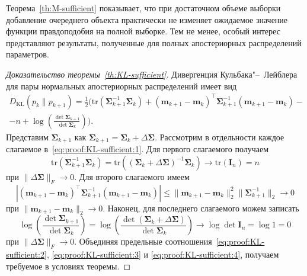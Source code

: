 Теорема~\ref{th:M-sufficient} показывает, что при достаточном объеме выборки добавление очереднего объекта практически не изменяет ожидаемое значение функции правдоподобия на полной выборке. Тем не менее, особый интерес представляют результаты, полученные для полных апостериорных распределений параметров.

\begin{proof}[Доказательство теоремы~\ref{th:KL-sufficient}]
    Дивергенция Кульбака"--~Лейблера для пары нормальных апостериорных распределений имеет вид
    \begin{multline}
        D_{\text{KL}}\left( p_k \| p_{k+1} \right) = \frac{1}{2} \Bigg( \mathrm{tr}\left( \mathbf{\Sigma}_{k+1}^{-1} \mathbf{\Sigma}_k \right) + (\mathbf{m}_{k+1} - \mathbf{m}_k)^\top \mathbf{\Sigma}_{k+1}^{-1} (\mathbf{m}_{k+1} - \mathbf{m}_k) - \\
        - n + \log{\left( \frac{\det \mathbf{\Sigma}_{k+1}}{\det \mathbf{\Sigma}_{k}} \right)} \Bigg). \label{eq:proof:KL-sufficient:1}
    \end{multline}
    Представим $\boldsymbol{\Sigma}_{k+1}$ как $\boldsymbol{\Sigma}_{k+1} = \boldsymbol{\Sigma}_k + \Delta \boldsymbol{\Sigma}$. Рассмотрим в отдельности каждое слагаемое в~\eqref{eq:proof:KL-sufficient:1}.
    Для первого слагаемого получаем
    \begin{equation}
        \mathrm{tr}\left( \mathbf{\Sigma}_{k+1}^{-1} \mathbf{\Sigma}_k \right) = \mathrm{tr}\left( \left( \mathbf{\Sigma}_k + \Delta \boldsymbol{\Sigma} \right)^{-1} \mathbf{\Sigma}_k \right) \to \mathrm{tr} \left( \mathbf{I}_n \right) = n \label{eq:proof:KL-sufficient:2}
    \end{equation}
    при $\| \Delta \boldsymbol{\Sigma} \|_F \to 0$. Для второго слагаемого имеем
    \begin{equation}
        \left| (\mathbf{m}_{k+1} - \mathbf{m}_k)^\top \mathbf{\Sigma}_{k+1}^{-1} (\mathbf{m}_{k+1} - \mathbf{m}_k) \right| \leqslant \| \mathbf{m}_{k+1} - \mathbf{m}_k \|_2^2 \| \mathbf{\Sigma}_{k+1}^{-1} \|_2 \to 0 \label{eq:proof:KL-sufficient:3}
    \end{equation}
    при $ \| \mathbf{m}_{k+1} - \mathbf{m}_k \|_2 \to 0$. Наконец, для последнего слагаемого можем записать
    \begin{equation}
        \log{\left( \frac{\det \mathbf{\Sigma}_{k+1}}{\det \mathbf{\Sigma}_{k}} \right)} = \log{\left( \frac{\det \left( \mathbf{\Sigma}_k + \Delta \boldsymbol{\Sigma} \right)}{\det \mathbf{\Sigma}_{k}} \right)} \to \log \det \mathbf{I}_n = \log 1 = 0 \label{eq:proof:KL-sufficient:4}
    \end{equation}
    при $ \| \Delta \boldsymbol{\Sigma} \|_F \to 0$. Объединяя предельные соотношения~\eqref{eq:proof:KL-sufficient:2}, \eqref{eq:proof:KL-sufficient:3} и \eqref{eq:proof:KL-sufficient:4}, получаем требуемое в условиях теоремы.
\end{proof}


